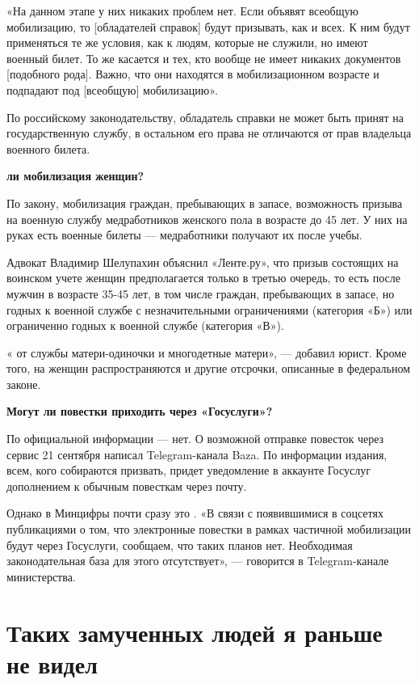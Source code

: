 «На данном этапе у них никаких проблем нет. Если объявят всеобщую мобилизацию, то [обладателей справок] будут призывать, как и всех. К ним будут применяться те же условия, как к людям, которые не служили, но имеют военный билет. То же касается и тех, кто вообще не имеет никаких документов [подобного рода]. Важно, что они находятся в мобилизационном возрасте и подпадают под [всеобщую] мобилизацию».

По российскому законодательству, обладатель справки не может быть принят на государственную службу, в остальном его права не отличаются от прав владельца военного билета.

\textbf{ ли мобилизация женщин?}

По закону, мобилизация граждан, пребывающих в запасе,  возможность призыва на военную службу медработников женского пола в возрасте до 45 лет. У них на руках есть военные билеты — медработники получают их после учебы.

Адвокат Владимир Шелупахин объяснил «Ленте.ру», что призыв состоящих на воинском учете женщин предполагается только в третью очередь, то есть после мужчин в возрасте 35-45 лет, в том числе граждан, пребывающих в запасе, но годных к военной службе с незначительными ограничениями (категория «Б») или ограниченно годных к военной службе (категория «В»).

«  от службы матери-одиночки и многодетные матери», — добавил юрист. Кроме того, на женщин распространяются и другие отсрочки, описанные в федеральном законе.

\textbf{Могут ли повестки приходить через «Госуслуги»?}

По официальной информации — нет. О возможной отправке повесток через сервис  21 сентября написал Telegram-канала Baza. По информации издания, всем, кого собираются призвать, придет уведомление в аккаунте Госуслуг дополнением к обычным повесткам через почту.

Однако в Минцифры почти сразу это . «В связи с появившимися в соцсетях публикациями о том, что электронные повестки в рамках частичной мобилизации будут  через Госуслуги, сообщаем, что таких планов нет. Необходимая законодательная база для этого отсутствует», — говорится в Telegram-канале министерства.

\newpage
\section{Таких замученных людей я раньше не видел}

